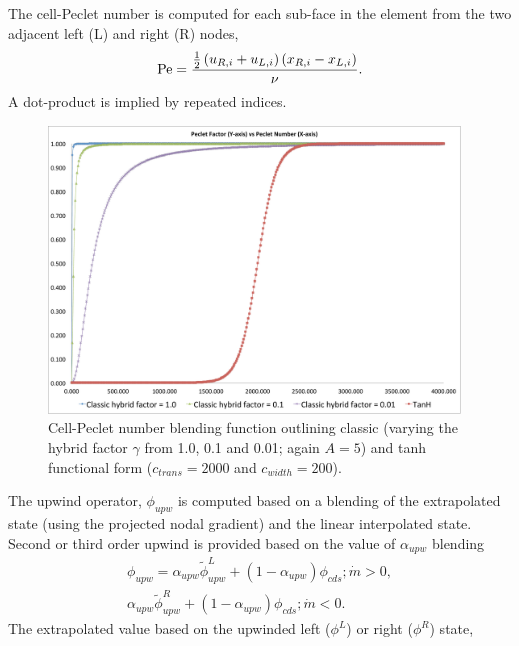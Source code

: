 The cell-Peclet number is computed for each sub-face in the element
from the two adjacent left (L) and right (R) nodes,
\begin{equation}
   {\rm Pe} = {{{1 \over 2} \left( u_{R,i} + u_{L,i} \right) 
                      \left( x_{R,i} - x_{L,i} \right) } \over \nu }.
\end{equation}
A dot-product is implied by repeated indices. 

\begin{figure} [h]
\centerline{\includegraphics[height=3.0in]{images/pecletFactor}}
\vspace{0.1in}
\caption{Cell-Peclet number blending function outlining classic (varying the hybrid factor $\gamma$ from 1.0, 0.1 and 0.01; again $A=5$) and tanh functional form ($c_{trans}=2000$ and $c_{width}=200$).}
\label{pec-blend}
\end{figure}
 
The upwind operator, $\phi_{upw}$ is computed based on a blending of the extrapolated
state (using the projected nodal gradient) and the linear interpolated state. Second 
or third order upwind is provided based on the value of $\alpha_{upw}$ blending
\begin{eqnarray}
 \phi_{upw} = \alpha_{upw}\tilde \phi^L_{upw} + \left(1-\alpha_{upw}\right)\phi_{cds}; \dot m > 0, \nonumber \\
             \alpha_{upw}\tilde\phi^R_{upw} + \left(1-\alpha_{upw}\right)\phi_{cds}; \dot m < 0.
\label{phiUpwindFull}
\end{eqnarray}
The extrapolated value based on the upwinded left ($\phi^L$) or right ($\phi^R$) state,

